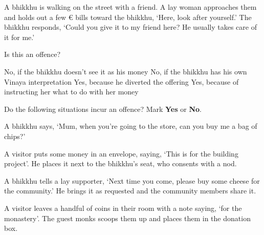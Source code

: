 \begin{exam}{\autoExamName}
\begin{problem*}
  \end{problem*}

  \problemDivide

  \begin{problem}

    A bhikkhu is walking on the street with a friend. A lay woman approaches
    them and holds out a few € bills toward the bhikkhu, `Here, look after
    yourself.' The bhikkhu responds, `Could you give it to my friend here? He
    usually takes care of it for me.'

    \bigskip

    Is this an offence?

    \bigskip

    \begin{answers}{1}
      \bChoices
       No, if the bhikkhu doesn't see it as his money\eAns
       No, if the bhikkhu has his own Vinaya interpretation\eAns
       Yes, because he diverted the offering\eAns
       Yes, because of instructing her what to do with her money\eAns
      \eChoices
    \end{answers}

  \end{problem}

  \problemDivide

  \begin{problem*}

    Do the following situations incur an offence? Mark \textbf{Yes} or \textbf{No}.

    \bigskip

    \begin{parts}

    \item {} A bhikkhu says, `Mum, when you're going to the store, can you
      buy me a bag of chips?'

    \item {} A visitor puts some money in an envelope, saying, `This is for
      the building project'. He places it next to the bhikkhu's seat, who
      consents with a nod.

    \item {} A bhikkhu tells a lay supporter, `Next time you come, please
      buy some cheese for the community.' He brings it as requested and the
      community members share it.

    \item {} A visitor leaves a handful of coins in their room with a note saying, `for the monastery'.
      The guest monks scoops them up and places them in the donation box.


\end{parts}
\end{problem*}
\end{exam}
